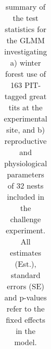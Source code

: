 \documentclass[10pt, twoside]{book} %
\begin{document}
\clearpage
\begin{landscape}
\thispagestyle{empty}
\begin{table}
	\begin{center}
		\begin{footnotesize}
			\caption{summary of the test statistics for the GLMM investigating a) winter forest use of 163 PIT-tagged great tits at the experimental site, and b) reproductive and physiological parameters of 32 nests included in the challenge experiment. All estimates (Est.), standard errors (SE) and p-values refer to the fixed effects in the model.}  \label{tab3-3}
			
			\begingroup
			\setlength{\tabcolsep}{8pt} %
			\renewcommand{\arraystretch}{1.5} %
			\begin{tabular}{l r r r r r r r r r}
				

\end{tabular}
\end{footnotesize}
\end{center}
\end{table}
\end{landscape}
\end{document}
